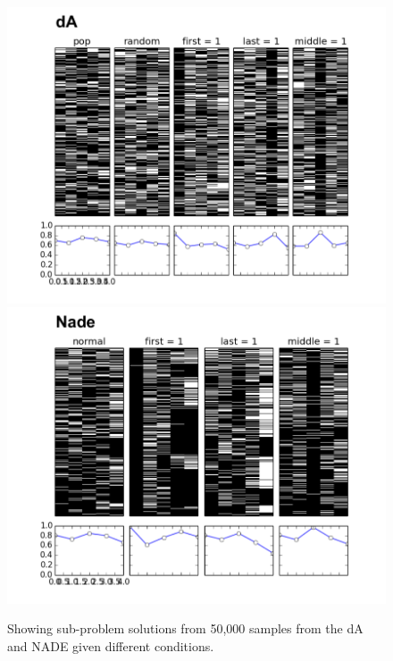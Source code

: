 \documentclass[twoside]{article}
\begin{document}
\begin{figure}[t!]
\centering
    \includegraphics[scale=0.7]{da_croad.pdf}
  \includegraphics[scale=0.7]{nade_croad.pdf}
  \caption{Showing sub-problem solutions from 50,000 samples from the dA and NADE given different conditions.}
  \label{fig:churchillroadexample}
\end{figure}
\end{document}
